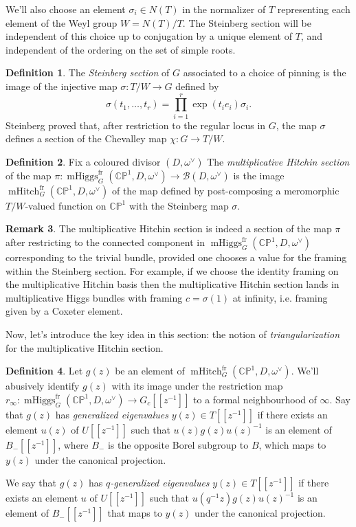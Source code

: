 \documentclass[11pt, oneside, reqno]{amsart}
\theoremstyle{definition} \newtheorem{definition}{Definition}[section]
\theoremstyle{definition} \newtheorem{remark}[definition]{Remark}
\theoremstyle{definition} \newtheorem{remarks}[definition]{Remarks}
\theoremstyle{definition} \newtheorem{question}[definition]{Question}
\theoremstyle{definition} \newtheorem*{note}{Note}
\theoremstyle{definition} \newtheorem{example}[definition]{Example}
\theoremstyle{definition} \newtheorem{examples}[definition]{Examples}
\newcommand{\bb}[1]{\mathbb{#1}}
\newcommand{\mc}[1]{\mathcal{#1}}
\DeclareMathOperator{\mhiggs}{mHiggs}
\DeclareMathOperator{\mhitch}{mHitch}
\newcommand{\fr}{\mathrm{fr}}
\begin{document}
We'll also choose an element $\sigma_i \in N(T)$ in the normalizer of $T$ representing each element of the Weyl group $W = N(T)/T$.  The Steinberg section will be independent of this choice up to conjugation by a unique element of $T$, and independent of the ordering on the set of simple roots.

\begin{definition} \label{Steinberg_section_def}
The \emph{Steinberg section} of $G$ associated to a choice of pinning is the image of the injective map $\sigma \colon T/W \to G$ defined by
\[\sigma(t_1, \ldots, t_r) = \prod_{i=1}^r \exp(t_i e_i) \sigma_i.\]
Steinberg proved \cite[Theorem 1.4]{Steinberg} that, after restriction to the regular locus in $G$, the map $\sigma$ defines a section of the Chevalley map $\chi \colon G \to T/W$.
\end{definition}

\begin{definition} \label{mhitch_section_def}
Fix a coloured divisor $(D,\omega^\vee)$ The \emph{multiplicative Hitchin section} of the map $\pi \colon \mhiggs^\fr_G(\bb{CP}^1,D,\omega^\vee) \to \mc B(D,\omega^\vee)$ is the image $\mhitch^\fr_G(\bb{CP}^1, D, \omega^\vee)$ of the map defined by post-composing a meromorphic $T/W$-valued function on $\bb{CP}^1$ with the Steinberg map $\sigma$.
\end{definition}

\begin{remark}
The multiplicative Hitchin section is indeed a section of the map $\pi$ after restricting to the connected component in $\mhiggs^\fr_G(\bb{CP}^1,D,\omega^\vee)$ corresponding to the trivial bundle, provided one chooses a value for the framing within the Steinberg section.  For example, if we choose the identity framing on the multiplicative Hitchin basis then the multiplicative Hitchin section lands in multiplicative Higgs bundles with framing $c = \sigma(1)$ at infinity, i.e. framing given by a Coxeter element.
\end{remark}

Now, let's introduce the key idea in this section: the notion of \emph{triangularization} for the multiplicative Hitchin section.
\begin{definition} \label{gen_evals_def}
Let $g(z)$ be an element of $\mhitch^\fr_G(\bb{CP}^1, D, \omega^\vee)$.  We'll abusively identify $g(z)$ with its image under the restriction map $r_\infty \colon \mhiggs_G^\fr(\bb{CP}^1,D,\omega^\vee) \to G_c[[z^{-1}]]$ to a formal neighbourhood of $\infty$.  Say that $g(z)$ has \emph{generalized eigenvalues} $y(z) \in T[[z^{-1}]]$ if there exists an element $u(z)$ of $U[[z^{-1}]]$ such that $u(z)g(z)u(z)^{-1}$ is an element of $B_-[[z^{-1}]]$, where $B_-$ is the opposite Borel subgroup to $B$, which maps to $y(z)$ under the canonical projection.

We say that $g(z)$ has \emph{$q$-generalized eigenvalues} $y(z) \in T[[z^{-1}]]$ if there exists an element $u$ of $U[[z^{-1}]]$ such that $u(q^{-1}z)g(z)u(z)^{-1}$ is an element of $B_-[[z^{-1}]]$ that maps to $y(z)$ under the canonical projection. 
\end{definition}
\end{document}
